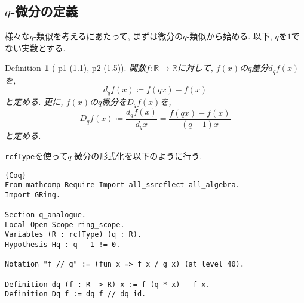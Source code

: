 \documentclass[11pt]{jsreport}
\theoremstyle{mystyle}
\newtheorem{df}{$\textrm{Definition}$}[subsection]
\newcommand{\bdf}{\begin{shadebox} \begin{df}}
\newcommand{\edf}{\end{df} \end{shadebox}}
\newcommand{\R}{\mathbb{R}}
\newcommand{\0}{\textbf{0}}
\newcommand{\1}{\textbf{1}}
\newcommand{\2}{\textbf{2}}
\begin{document}
\subsection{$q$-微分の定義}
様々な$q$-類似を考えるにあたって, まずは微分の$q$-類似から始める. 以下, $q$を$1$でない実数とする. 
\bdf[\cite{Kac} p1 (1.1), p2 (1.5)]
  関数$f : \R \to \R$に対して, $f(x)$の$q$差分$d_q f(x)$を, 
  \[
    d_q f(x) \coloneqq f (qx) - f(x)
  \]
  と定める. 更に, $f(x)$の$q$微分を$D_q f(x)$を, 
  \[
    D_q f(x) \coloneqq \frac{d_q f(x)}{d_q x} = \frac{f(qx) - f(x)}{(q - 1) x}
  \]
  と定める. 
\edf
{\tt rcfType}を使って$q$-微分の形式化を以下のように行う. 
\begin{lstlisting}{Coq}
From mathcomp Require Import all_ssreflect all_algebra.
Import GRing.

Section q_analogue.
Local Open Scope ring_scope.
Variables (R : rcfType) (q : R).
Hypothesis Hq : q - 1 != 0.

Notation "f // g" := (fun x => f x / g x) (at level 40).

Definition dq (f : R -> R) x := f (q * x) - f x.
Definition Dq f := dq f // dq id. \end{lstlisting}
\end{document}
